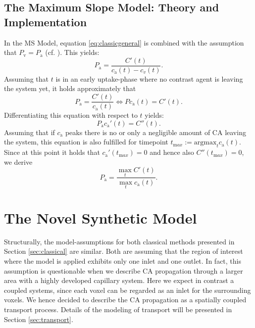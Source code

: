 \documentclass[paper=a4, fontsize=11pt,parskip=half,headings=small]{scrartcl}
\newcommand{\ca}{c_\mathrm{a}}
\newcommand{\Pa}{P_{\mathrm{a}}}
\newcommand{\Pout}{P_{\mathrm{v}}}
\begin{document}
	
	
	
	\subsection{The Maximum Slope Model: Theory and Implementation}\label{sec:ms}	
	In the MS Model, equation \eqref{eq:classicgeneral} is combined with the assumption that $\Pout = \Pa$ (cf. \cite{klotz99}).
	This yields:
	\[
		\Pa = \frac{C'(t)}{\ca(t) - c_v(t)}.
	\]
	Assuming that $t$ is in an early uptake-phase where no contrast agent is leaving the system yet, it holds approximately that
	\[
		\Pa = \frac{C'(t)}{\ca(t)} \iff P\ca(t) = C'(t).
	\]
	Differentiating this equation with respect to $t$ yields:
	\[
		\Pa \ca'(t) = C''(t).
	\]
	Assuming that if $\ca$ peaks there is no or only a negligible amount of CA leaving the system, this equation is also fulfilled for timepoint $t_{\mathrm max}:=\mathrm{argmax}_{t}\ca(t)$. 
	Since at this point it holds that $\ca'(t_{\mathrm max}) = 0$ and hence also $C''(t_{\mathrm max})=0$, we derive
	\begin{equation}\label{eq:MS}
		\Pa = \frac{\max_{t}C'(t)}{\max_{t}\ca(t)}.
	\end{equation}
	
	
	
	
	
	
	
	
	\section{The Novel Synthetic Model}\label{sec:synthetic}
	
	Structurally, the model-assumptions for both classical methods presented in Section \ref{sec:classical} are similar.
	Both are assuming that the region of interest where the model is applied exhibits only one inlet and one outlet.
	In fact, this assumption is questionable when we describe CA propagation through a larger area with a highly developed capillary system.
	Here we expect in contrast a coupled systems, since each voxel can be regarded as an inlet for the surrounding voxels.
	We hence decided to describe the CA propagation as a spatially coupled transport process. 
	Details of the modeling of transport will be presented in Section \ref{sec:transport}.	
	
\end{document}
